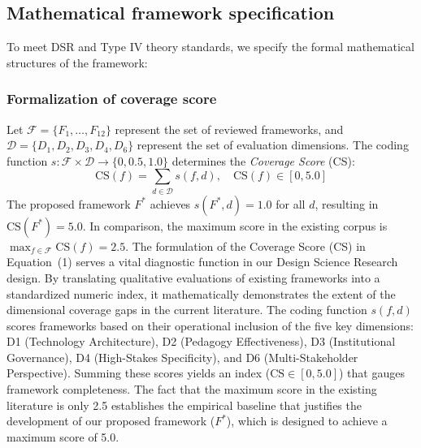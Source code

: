 \documentclass[11pt,a4paper]{article}
\begin{document}
\subsection{Mathematical framework specification}

To meet DSR and Type IV theory standards, we specify the formal mathematical structures of the framework:

\subsubsection{Formalization of coverage score}
Let $\mathcal{F} = \{F_1, \ldots, F_{12}\}$ represent the set of reviewed frameworks, and $\mathcal{D} = \{D_1, D_2, D_3, D_4, D_6\}$ represent the set of evaluation dimensions. The coding function $s: \mathcal{F} \times \mathcal{D} \to \{0, 0.5, 1.0\}$ determines the \textit{Coverage Score} (CS):
\begin{equation}
  \text{CS}(f) = \sum_{d \in \mathcal{D}} s(f,d), \quad \text{CS}(f) \in [0, 5.0]
\end{equation}
The proposed framework $F^*$ achieves $s(F^*, d) = 1.0$ for all $d$, resulting in $\text{CS}(F^*) = 5.0$. In comparison, the maximum score in the existing corpus is $\max_{f \in \mathcal{F}} \text{CS}(f) = 2.5$. The formulation of the Coverage Score (CS) in Equation~(1) serves a vital diagnostic function in our Design Science Research design. By translating qualitative evaluations of existing frameworks into a standardized numeric index, it mathematically demonstrates the extent of the dimensional coverage gaps in the current literature. The coding function $s(f,d)$ scores frameworks based on their operational inclusion of the five key dimensions: D1 (Technology Architecture), D2 (Pedagogy Effectiveness), D3 (Institutional Governance), D4 (High-Stakes Specificity), and D6 (Multi-Stakeholder Perspective). Summing these scores yields an index ($\text{CS} \in [0, 5.0]$) that gauges framework completeness. The fact that the maximum score in the existing literature is only 2.5 establishes the empirical baseline that justifies the development of our proposed framework ($F^*$), which is designed to achieve a maximum score of 5.0.
\end{document}
